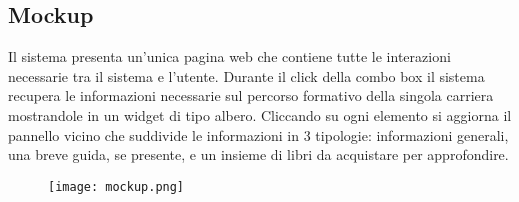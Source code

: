 \subsection{Mockup}
Il sistema presenta un'unica pagina web che contiene tutte le interazioni necessarie tra il sistema e l'utente. Durante il click della combo box il sistema recupera le informazioni necessarie sul percorso formativo della singola carriera mostrandole in un widget di tipo albero. Cliccando su ogni elemento si aggiorna il pannello vicino che suddivide le informazioni in 3 tipologie: informazioni generali, una breve guida, se presente, e un insieme di libri da acquistare per approfondire.
\begin{figure}[H]
\begin{center}
 \texttt{[image: mockup.png]}
\end{center}
\end{figure}
